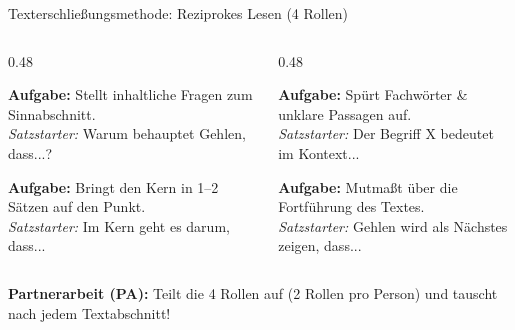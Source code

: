 \documentclass[aspectratio=169, 10pt]{beamer}
\begin{document}
\begin{frame}{Texterschließungsmethode: Reziprokes Lesen (4 Rollen)}
    \vspace{-0.25cm}
    \begin{columns}[T]
        \begin{column}{0.48\textwidth}
            \begin{tcolorbox}[modernCard, colframe=primaryBlue, colback=lightBlue, title={\faQuestionCircle\ 1. Der Frager}]
                \footnotesize
                \textbf{Aufgabe:} Stellt inhaltliche Fragen zum Sinnabschnitt.\\[2pt]
                \textit{Satzstarter:} \glqq Warum behauptet Gehlen, dass...?\grqq
            \end{tcolorbox}
            \vspace{0.12cm}
            \begin{tcolorbox}[modernCard, colframe=accentGreen, colback=accentGreen!8, title={\faAlignLeft\ 3. Der Zusammenfasser}]
                \footnotesize
                \textbf{Aufgabe:} Bringt den Kern in 1–2 Sätzen auf den Punkt.\\[2pt]
                \textit{Satzstarter:} \glqq Im Kern geht es darum, dass...\grqq
            \end{tcolorbox}
        \end{column}

        \begin{column}{0.48\textwidth}
            \begin{tcolorbox}[modernCard, colframe=accentOrange, colback=accentOrange!8, title={\faSearch\ 2. Der Klärer}]
                \footnotesize
                \textbf{Aufgabe:} Spürt Fachwörter \& unklare Passagen auf.\\[2pt]
                \textit{Satzstarter:} \glqq Der Begriff X bedeutet im Kontext...\grqq
            \end{tcolorbox}
            \vspace{0.12cm}
            \begin{tcolorbox}[modernCard, colframe=primaryBlue!70, colback=primaryBlue!6, title={\faLightbulb\ 4. Der Vorhersager}]
                \footnotesize
                \textbf{Aufgabe:} Mutmaßt über die Fortführung des Textes.\\[2pt]
                \textit{Satzstarter:} \glqq Gehlen wird als Nächstes zeigen, dass...\grqq
            \end{tcolorbox}
        \end{column}
    \end{columns}

    \vspace{0.15cm}
    \centering\footnotesize
    \textbf{Partnerarbeit (PA):} Teilt die 4 Rollen auf (2 Rollen pro Person) und tauscht nach jedem Textabschnitt!
\end{frame}
\end{document}
